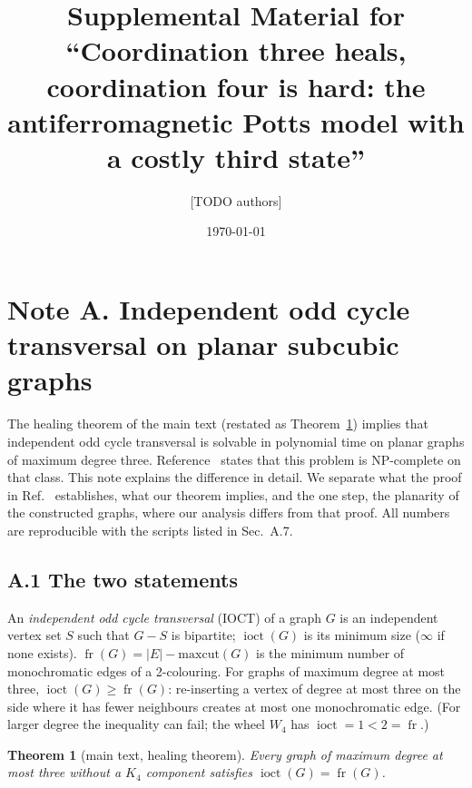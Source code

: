 \documentclass[aps,pre,onecolumn,superscriptaddress,nofootinbib]{revtex4-2}
\newtheorem{theorem}{Theorem}
\theoremstyle{remark}
\newcommand{\fr}{\operatorname{fr}}
\newcommand{\ioct}{\operatorname{ioct}}
\begin{document}
\title{Supplemental Material for ``Coordination three heals, coordination four is hard:
the antiferromagnetic Potts model with a costly third state''}
\author{[TODO authors]}
\date{\today}
\maketitle

\section*{Note A. Independent odd cycle transversal on planar subcubic graphs}

The healing theorem of the main text (restated as Theorem~\ref{thm:S-heal}) implies that
independent odd cycle transversal is solvable in polynomial time on planar graphs of maximum
degree three. Reference~\cite{Johnson2025} states that this problem is NP-complete on that class.
This note explains the difference in detail. We separate what the proof in Ref.~\cite{Johnson2025}
establishes, what our theorem implies, and the one step, the planarity of the constructed graphs,
where our analysis differs from that proof. All numbers are reproducible with the scripts listed
in Sec.~A.7.

\subsection*{A.1 The two statements}

An \emph{independent odd cycle transversal} (IOCT) of a graph $G$ is an independent vertex set
$S$ such that $G-S$ is bipartite; $\ioct(G)$ is its minimum size ($\infty$ if none exists).
$\fr(G)=|E|-\mathrm{maxcut}(G)$ is the minimum number of monochromatic edges of a 2-colouring.
For graphs of maximum degree at most three, $\ioct(G)\ge\fr(G)$: re-inserting a vertex of degree at
most three on the side where it has fewer neighbours creates at most one monochromatic edge. (For
larger degree the inequality can fail; the wheel $W_4$ has $\ioct=1<2=\fr$.)

\begin{theorem}[main text, healing theorem]\label{thm:S-heal}
Every graph of maximum degree at most three without a $K_4$ component satisfies $\ioct(G)=\fr(G)$.
\end{theorem}
\end{document}
